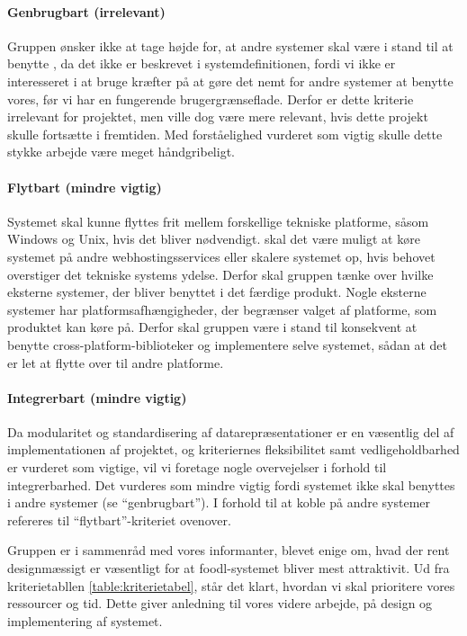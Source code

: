 \paragraph{Genbrugbart (irrelevant)} 
Gruppen ønsker ikke at tage højde for, at andre systemer skal være i stand til at benytte \Foodl{}, da det ikke er beskrevet i systemdefinitionen, fordi vi ikke er interesseret i at bruge kræfter på at gøre det nemt for andre systemer at benytte vores, før vi har en fungerende brugergrænseflade. Derfor er dette kriterie irrelevant for projektet, men ville dog være mere relevant, hvis dette projekt skulle fortsætte i fremtiden. Med forståelighed vurderet som vigtig skulle dette stykke arbejde være meget håndgribeligt.

\paragraph{Flytbart (mindre vigtig)} 
Systemet skal kunne flyttes frit mellem forskellige tekniske platforme, såsom Windows og Unix, hvis det bliver nødvendigt. \Fx skal det være muligt at køre systemet på andre webhostingsservices eller skalere systemet op, hvis behovet overstiger det tekniske systems ydelse. Derfor skal gruppen tænke over hvilke eksterne systemer, der bliver benyttet i det færdige produkt. Nogle eksterne systemer har platformsafhængigheder, der begrænser valget af platforme, som produktet kan køre på. Derfor skal gruppen være i stand til konsekvent at benytte cross-platform-biblioteker og implementere selve systemet, sådan at det er let at flytte over til andre platforme.

\paragraph{Integrerbart (mindre vigtig)} 
Da modularitet og standardisering af datarepræsentationer er en væsentlig del af implementationen af projektet, og kriteriernes fleksibilitet samt vedligeholdbarhed er vurderet som vigtige, vil vi foretage nogle overvejelser i forhold til integrerbarhed. Det vurderes som mindre vigtig fordi systemet ikke skal benyttes i andre systemer (se ``genbrugbart''). I forhold til at koble på andre systemer refereres til ``flytbart''-kriteriet ovenover.

Gruppen er i sammenråd med vores informanter, blevet enige om, hvad der rent designmæssigt er væsentligt for at foodl-systemet bliver mest attraktivit. Ud fra kriterietabllen \ref{table:kriterietabel}, står det klart, hvordan vi skal prioritere vores ressourcer og tid. Dette giver anledning til vores videre arbejde, på design og implementering af systemet.

